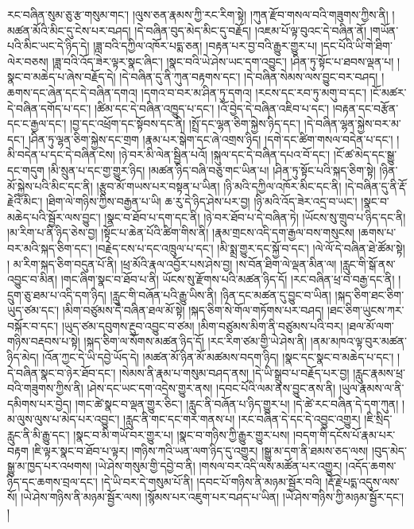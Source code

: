 རང་བཞིན་སུམ་ཅུ་རྩ་གསུམ་གང་། །ལུས་ཅན་རྣམས་ཀྱི་རང་རིག་སྟེ། །ཀུན་རྫོབ་གསལ་བའི་གཟུགས་ཀྱིས་ནི། །མཚན་མོའི་མིང་དུ་ངེས་པར་བཤད། །དེ་བཞིན་བུད་མེད་མིང་དུ་བརྗོད། །འཇམ་པོ་ལྟ་བུའང་དེ་བཞིན་ནོ། །གཡོན་པའི་མིང་ཡང་དེ་ཉིད་དེ། །ཟླ་བའི་དཀྱིལ་འཁོར་པདྨ་ཅན། །བརྟན་པར་བྱ་བའི་རྒྱུར་གྱུར་པ། །དང་པོའི་ཡི་གེ་ཐིག་ལེར་བཅས། །ཟླ་བའི་འོད་ཟེར་ལྟར་སྣང་ཞིང་། །སྣང་བའི་ཡེ་ཤེས་ཡང་དག་འབྱུང་། །ཤིན་ཏུ་སྟོང་པ་ཐབས་ལྡན་པ། །སྣང་བ་མཆེད་པ་ཞེས་བརྗོད་དེ། །དེ་བཞིན་དུ་ནི་ཀུན་བརྟགས་དང་། །དེ་བཞིན་སེམས་ལས་བྱུང་བར་བཤད། །ཆགས་དང་ཞེན་དང་དེ་བཞིན་དགའ། །དགའ་བ་བར་མ་ཤིན་ཏུ་དགའ། །རངས་དང་རབ་ཏུ་མགུ་བ་དང་། །ངོ་མཚར་དེ་བཞིན་དགོད་པ་དང་། །ཚིམ་དང་དེ་བཞིན་འཁྱུད་པ་དང་། །འོ་བྱེད་དེ་བཞིན་འཇིབ་པ་དང་། །བརྟན་དང་བརྩོན་དང་ང་རྒྱལ་དང་། །བྱ་དང་འཕྲོག་དང་སྟོབས་དང་ནི། །སྤྲོ་དང་ལྷན་ཅིག་སྐྱེས་ཉིད་དང་། །དེ་བཞིན་ལྷན་སྐྱེས་བར་མ་དང་། །ཤིན་ཏུ་ལྷན་ཅིག་སྐྱེས་དང་གྲག །རྣམ་པར་སྒེག་དང་ཞེ་འགྲས་ཉིད། །དགེ་དང་ཚིག་གསལ་བདེན་པ་དང་། །མི་བདེན་པ་དང་དེ་བཞིན་ངེས། །ཉེ་བར་མི་ལེན་སྦྱིན་པའོ། །སྐུལ་དང་དེ་བཞིན་དཔའ་བོ་དང་། །ངོ་ཚ་མེད་དང་སྒྱུ་དང་གདུག །མི་སྲུན་པ་དང་གྱ་གྱུར་ཉིད། །མཚན་ཉིད་བཞི་བཅུ་གང་ཡིན་པ། །ཤིན་ཏུ་སྟོང་པའི་སྐད་ཅིག་སྟེ། །ཉིན་མོ་སྐྱེས་པའི་མིང་དང་ནི། །རྩུབ་མོ་གཡས་པར་བསྟན་པ་ཡིན། །ཉི་མའི་དཀྱིལ་འཁོར་མིང་དང་ནི། །དེ་བཞིན་དུ་ནི་རྡོ་རྗེའི་མིང་། །ཐིག་ལེ་གཉིས་ཀྱིས་བརྒྱན་པ་ཡི། ཆ་རུ་དེ་ཉིད་ཤེས་པར་བྱ། །ཉི་མའི་འོད་ཟེར་འདྲ་བ་ཡང་། །སྣང་བ་མཆེད་པའི་སྦྱོར་ལས་བྱུང་། །སྣང་བ་ཐོབ་པ་དག་དང་ནི། །ཉེ་བར་ཐོབ་པ་དེ་བཞིན་ཏེ། །ཡོངས་སུ་གྲུབ་པ་ཉིད་དང་ནི། །མ་རིག་པ་ནི་ཉིད་ཅེས་བྱ། །སྟོང་པ་ཆེན་པོའི་ཚིག་གིས་ནི། །རྣམ་གྲངས་འདི་དག་རྒྱལ་བས་གསུངས། །ཆགས་པ་བར་མའི་སྐད་ཅིག་དང་། །བརྗེད་ངས་པ་དང་འཁྲུལ་པ་དང་། །མི་སྨྲ་གྱུར་དང་སྐྱོ་བ་དང་། །ལེ་ལོ་དེ་བཞིན་ཐེ་ཚོམ་སྟེ། །
མ་རིག་སྐད་ཅིག་བདུན་པོ་ནི། །ཕྲ་མོའི་རྣལ་འབྱོར་པས་ཤེས་བྱ། །ས་བོན་ཐིག་ལེ་ལྡན་མིན་ལ། །རླུང་གི་སྒོ་ནས་འབྱུང་བ་མིན། །གང་ཞིག་སྣང་བ་ཐོབ་པ་ནི། ཡོངས་སུ་རྫོགས་པའི་མཚན་ཉིད་དོ། །རང་བཞིན་ཕྲ་བ་བརྒྱ་དང་ནི། །དྲུག་ཅུ་ཐམ་པ་འདི་དག་ཉིད། །རླུང་གི་བཞོན་པའི་རྒྱུ་ཡིས་ནི། །ཉིན་དང་མཚན་དུ་བྱུང་བ་ཡིན། །སྐད་ཅིག་ཐང་ཅིག་ཡུད་ཙམ་དང་། །མིག་བཙུམས་དེ་བཞིན་ཐལ་མོ་སྟེ། །སྐད་ཅིག་སེ་གོལ་གཏོགས་པར་བཤད། །ཐང་ཅིག་ཡུངས་ཀར་བསྐོར་བ་དང་། །ཡུད་ཙམ་དབུགས་རྔུབ་འབྱུང་བ་ཙམ། །མིག་བཙུམས་མིག་ནི་བཙུམས་པའི་བར། །ཐལ་མོ་ལག་གཉིས་བརྡབས་པ་སྟེ། །སྐད་ཅིག་ལ་སོགས་མཚན་ཉིད་དོ། །རང་རིག་ཙམ་གྱི་ཡེ་ཤེས་ནི། །ནམ་མཁའ་ལྟ་བུར་མཚན་ཉིད་མེད། །འོན་ཀྱང་དེ་ཡི་དབྱེ་ཡོད་དེ། །མཚན་མོ་ཉིན་མོ་མཚམས་བདག་ཉིད། །སྣང་དང་སྣང་བ་མཆེད་པ་དང་། །དེ་བཞིན་སྣང་བ་ཉེར་ཐོབ་དང་། །སེམས་ནི་རྣམ་པ་གསུམ་བཤད་ནས། །དེ་ཡི་སྒྲུབ་པ་བརྗོད་པར་བྱ། །རླུང་རྣམས་ཕྲ་བའི་གཟུགས་ཀྱིས་ནི། །ཤེས་དང་ཡང་དག་འདྲེས་གྱུར་ནས། །དབང་པོའི་ལམ་ནས་བྱུང་ནས་ནི། །ཡུལ་རྣམས་ལ་ནི་དམིགས་པར་བྱེད། །གང་ཚེ་སྣང་བ་ལྡན་གྱུར་ཅིང་། །རླུང་ནི་བཞོན་པ་ཉིད་གྱུར་པ། །དེ་ཚེ་རང་བཞིན་དེ་དག་ཀུན། །མ་ལུས་ལུས་པ་མེད་པར་འབྱུང་། །རླུང་ནི་གང་དང་གར་གནས་པ། །རང་བཞིན་དེ་དང་དེ་འབྱུང་འགྱུར། །ཇི་སྲིད་རླུང་ནི་མི་རྒྱུ་དང་། །སྣང་བ་མི་གཡོ་བར་གྱུར་པ། །སྣང་བ་གཉིས་ཀྱི་རྒྱུར་གྱུར་པས། །བདག་གི་དངོས་པོ་རྣམ་པར་བརྟག །ཇི་ལྟར་སྣང་བ་ཐོབ་པ་ལྟར། །གཉིས་ཀའི་ཡན་ལག་ཉིད་དུ་འགྱུར། །སྒྱུ་མ་དག་ནི་ཐམས་ཅད་ལས། །བུད་མེད་སྒྱུ་མ་ཁྱད་པར་འཕགས། །ཡེ་ཤེས་གསུམ་གྱི་དབྱེ་བ་ནི། །གསལ་བར་འདི་ལས་མཚོན་པར་འགྱུར། །འདོད་ཆགས་ཉིད་དང་ཆགས་བྲལ་དང་། །དེ་ཡི་བར་དེ་གསུམ་པོ་ནི། །དབང་པོ་གཉིས་ནི་མཉམ་སྦྱོར་བའི། །རྡོ་རྗེ་པདྨ་འདུས་ལས་སོ། །ཡེ་ཤེས་གཉིས་ནི་མཉམ་སྦྱོར་ལས། །སྙོམས་པར་འཇུག་པར་བཤད་པ་ཡིན། །ཡེ་ཤེས་གཉིས་ཀྱི་མཉམ་སྦྱོར་དང་། །
